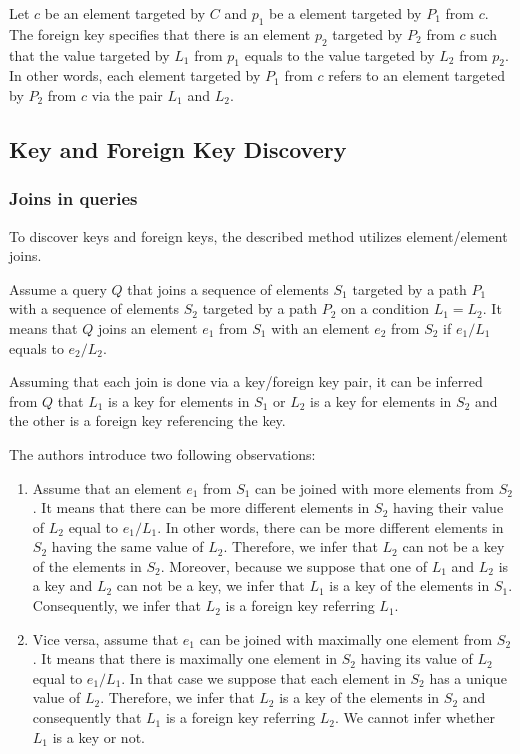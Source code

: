 
Let $c$ be an element targeted by $C$ and $p_1$ be a element targeted by $P_1$ from $c$. The foreign key specifies that there is an element $p_2$ targeted by $P_2$ from $c$ such that the value targeted by $L_1$ from $p_1$ equals to the value targeted by $L_2$ from $p_2$. In other words, each element targeted by $P_1$ from $c$ refers to an element targeted by $P_2$ from $c$ via the pair $L_1$ and $L_2$.

\subsection{Key and Foreign Key Discovery}
\subsubsection{Joins in queries}
To discover keys and foreign keys, the described method utilizes element/element joins.

Assume a query $Q$ that joins a sequence of elements $S_1$ targeted by a path $P_1$ with a sequence of elements $S_2$ targeted by a path $P_2$ on a condition $L_1 = L_2$. It means that $Q$ joins an element $e_1$ from $S_1$ with an element $e_2$ from $S_2$ if $e_1/L_1$ equals to $e_2/L_2$.


Assuming that each join is done via a key/foreign key pair, it can be inferred from $Q$ that $L_1$ is a key for elements in $S_1$ or $L_2$ is a key for elements in $S_2$ and the other is a foreign key referencing the key.

The authors introduce two following observations:
\begin{enumerate}
\renewcommand{\theenumi}{(O\arabic{enumi})}
\renewcommand{\labelenumi}{\theenumi}
\item Assume that an element $e_1$ from $S_1$ can be joined with more elements from $S_2$. It means that there can be more different elements in $S_2$ having their value of $L_2$ equal to $e_1/L_1$. In other words, there can be more different elements in $S_2$ having the same value of $L_2$. Therefore, we infer that $L_2$ can not be a key of the elements in $S_2$. Moreover, because we suppose that one of $L_1$ and $L_2$ is a key and $L_2$ can not be a key, we infer that $L_1$ is a key of the elements in $S_1$. Consequently, we infer that $L_2$ is a foreign key referring $L_1$.
\item Vice versa, assume that $e_1$ can be joined with maximally one element from $S_2$. It means that there is maximally one element in $S_2$ having its value of $L_2$ equal to $e_1/L_1$. In that case we suppose that each element in $S_2$ has a unique value of $L_2$. Therefore, we infer that $L_2$ is a key of the elements in $S_2$ and consequently that $L_1$ is a foreign key referring $L_2$. We cannot infer whether $L_1$ is a key or not.
\end{enumerate}

